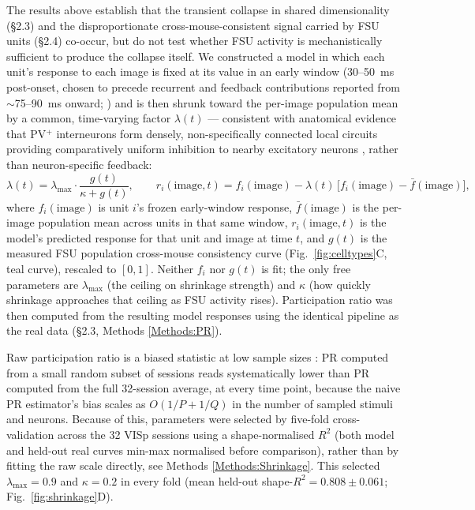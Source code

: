 \documentclass[11pt,onecolumn]{article}
\begin{document}
The results above establish that the transient collapse in shared
dimensionality (\S2.3) and the disproportionate cross-mouse-consistent
signal carried by FSU units (\S2.4) co-occur, but do not test whether FSU
activity is mechanistically sufficient to produce the collapse itself. We
constructed a model in which each unit's response to each image is fixed at
its value in an early window (30--50~ms post-onset, chosen to precede
recurrent and feedback contributions reported from $\sim$75--90~ms
onward; \citep{lamme2000, kirchberger2021}) and is
then shrunk toward the per-image population mean by a common, time-varying
factor $\lambda(t)$ --- consistent with anatomical evidence that PV$^+$
interneurons form densely, non-specifically connected local circuits
providing comparatively uniform inhibition to nearby excitatory neurons
\citep{packer2011}, rather than neuron-specific feedback:
\begin{equation}
  \lambda(t) = \lambda_\mathrm{max} \cdot \frac{g(t)}{\kappa + g(t)}, \qquad
  r_i(\mathrm{image}, t) = f_i(\mathrm{image}) - \lambda(t)\,
  \big[f_i(\mathrm{image}) - \bar{f}(\mathrm{image})\big],
\end{equation}
where $f_i(\mathrm{image})$ is unit $i$'s frozen early-window response,
$\bar{f}(\mathrm{image})$ is the per-image population mean across units in
that same window, $r_i(\mathrm{image}, t)$ is the model's predicted
response for that unit and image at time $t$, and $g(t)$ is the measured
FSU population cross-mouse
consistency curve (Fig.~\ref{fig:celltypes}C, teal curve), rescaled to
$[0,1]$. Neither $f_i$ nor $g(t)$ is fit; the only free parameters are
$\lambda_\mathrm{max}$ (the ceiling on shrinkage strength) and $\kappa$
(how quickly shrinkage approaches that ceiling as FSU activity rises).
Participation ratio was then computed from the resulting model responses
using the identical pipeline as the real data (\S2.3, Methods
\ref{Methods:PR}).

Raw participation ratio is a biased statistic at low sample sizes
\citep{chun2026estimating}: PR computed from a small random subset of
sessions reads systematically lower than PR computed from the full
32-session average, at every time point, because the naive PR estimator's
bias scales as $O(1/P + 1/Q)$ in the number of sampled stimuli and
neurons. Because of this, parameters were selected by
five-fold cross-validation across the 32 VISp sessions using a
shape-normalised $R^2$ (both model and held-out real curves min-max
normalised before comparison), rather than by
fitting the raw scale directly, see Methods \ref{Methods:Shrinkage}. This
selected $\lambda_\mathrm{max} = 0.9$ and $\kappa = 0.2$ in every fold (mean
held-out shape-$R^2 = 0.808 \pm 0.061$; Fig.~\ref{fig:shrinkage}D).
\end{document}
